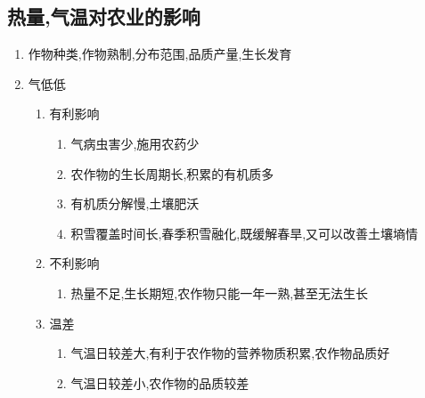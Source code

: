 \documentclass[a4paper]{article}
\begin{document}
    \subsection{热量,气温对农业的影响}
    \begin{enumerate}
        \item 作物种类,作物熟制,分布范围,品质产量,生长发育
        \item 气低低
        \begin{enumerate}
            \item 有利影响
            \begin{enumerate}
                \item 气病虫害少,施用农药少
                \item 农作物的生长周期长,积累的有机质多
                \item 有机质分解慢,土壤肥沃
                \item 积雪覆盖时间长,春季积雪融化,既缓解春旱,又可以改善土壤墒情
            \end{enumerate}
            \item 不利影响
            \begin{enumerate}
                \item 热量不足,生长期短,农作物只能一年一熟,甚至无法生长
            \end{enumerate}
            \item 温差
            \begin{enumerate}
                \item 气温日较差大,有利于农作物的营养物质积累,农作物品质好
                \item 气温日较差小,农作物的品质较差
            \end{enumerate}
        \end{enumerate}
    \end{enumerate}
\end{document}
